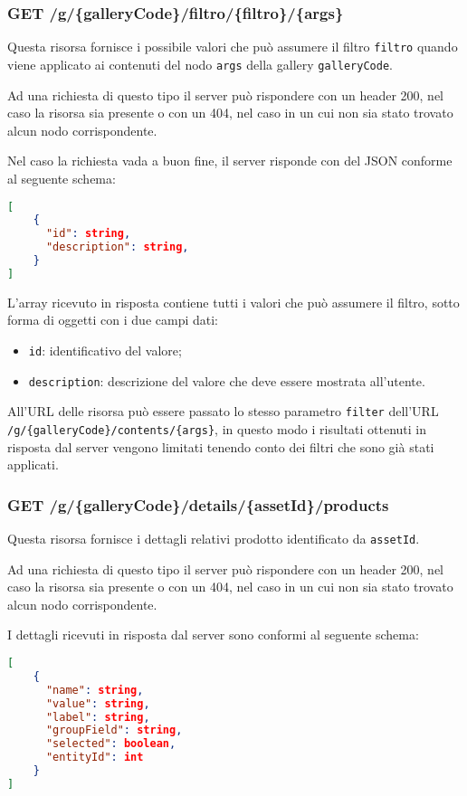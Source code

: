 \subsubsection{GET /g/\{galleryCode\}/filtro/\{filtro\}/\{args\}}

Questa risorsa fornisce i possibile valori che può assumere il filtro \texttt{filtro} quando viene applicato ai contenuti del nodo \texttt{args} della gallery \texttt{galleryCode}.

Ad una richiesta di questo tipo il server può rispondere con un header 200, nel caso la risorsa sia presente o con un 404, nel caso in un cui non sia stato trovato alcun nodo corrispondente.

Nel caso la richiesta vada a buon fine, il server risponde con del JSON conforme al seguente schema:

\begin{lstlisting}[language=JSON, caption=JSON Schema di GET /g/{galleryCode}/filtro/{filtro}/{args}]
[
	{
	  "id": string,
	  "description": string,
	}
]
\end{lstlisting}

L'array ricevuto in risposta contiene tutti i valori che può assumere il filtro, sotto forma di oggetti con i due campi dati:
\begin{itemize}
\item \texttt{id}: identificativo del valore;
\item \texttt{description}: descrizione del valore che deve essere mostrata all'utente. 
\end{itemize}

All'URL delle risorsa può essere passato lo stesso parametro \texttt{filter} dell'URL \texttt{/g/\{galleryCode\}/contents/\{args\}}, in questo modo i risultati ottenuti in risposta dal server vengono limitati tenendo conto dei filtri che sono già stati applicati.

\subsubsection{GET /g/\{galleryCode\}/details/\{assetId\}/products}

Questa risorsa fornisce i dettagli relativi prodotto identificato da \texttt{assetId}.

Ad una richiesta di questo tipo il server può rispondere con un header 200, nel caso la risorsa sia presente o con un 404, nel caso in un cui non sia stato trovato alcun nodo corrispondente.

I dettagli ricevuti in risposta dal server sono conformi al seguente schema:
\begin{lstlisting}[language=JSON, caption=JSON Schema di GET /g/{galleryCode}/filtro/{filtro}/{args}]
[
	{
	  "name": string,
	  "value": string,
	  "label": string,
	  "groupField": string,
	  "selected": boolean,
	  "entityId": int
	}
]
\end{lstlisting}

